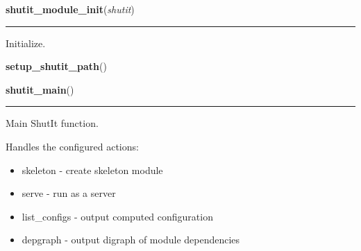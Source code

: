     \label{shutit_main:shutit_module_init}

    \vspace{0.5ex}

\hspace{.8\funcindent}\begin{boxedminipage}{\funcwidth}

    \raggedright \textbf{shutit\_module\_init}(\textit{shutit})

    \vspace{-1.5ex}

    \rule{\textwidth}{0.5\fboxrule}
\setlength{\parskip}{2ex}
    Initialize.

\setlength{\parskip}{1ex}
    \end{boxedminipage}

    \label{shutit_main:setup_shutit_path}

    \vspace{0.5ex}

\hspace{.8\funcindent}\begin{boxedminipage}{\funcwidth}

    \raggedright \textbf{setup\_shutit\_path}()

\setlength{\parskip}{2ex}
\setlength{\parskip}{1ex}
    \end{boxedminipage}

    \label{shutit_main:shutit_main}

    \vspace{0.5ex}

\hspace{.8\funcindent}\begin{boxedminipage}{\funcwidth}

    \raggedright \textbf{shutit\_main}()

    \vspace{-1.5ex}

    \rule{\textwidth}{0.5\fboxrule}
\setlength{\parskip}{2ex}
    Main ShutIt function.

    Handles the configured actions:

    \begin{itemize}
    \setlength{\parskip}{0.6ex}
      \item skeleton     - create skeleton module

      \item serve        - run as a server

      \item list\_configs - output computed configuration

      \item depgraph     - output digraph of module dependencies

    \end{itemize}

\setlength{\parskip}{1ex}
    \end{boxedminipage}

